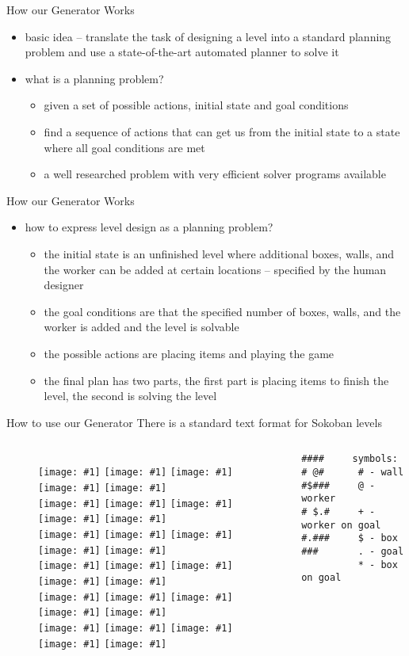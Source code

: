\documentclass[12pt, aspectratio=169]{beamer} %
\newcommand{\sokoimg}[1]{\texttt{[image: \#1]} \hspace{-0.31em}}
\newcommand{\w}{\sokoimg{../figures/wall.pdf}}
\newcommand{\e}{\sokoimg{../figures/empty.pdf}}
\newcommand{\p}{\sokoimg{../figures/player.pdf}}
\newcommand{\x}{\sokoimg{../figures/box.pdf}}
\newcommand{\g}{\sokoimg{../figures/goal.pdf}}
\newcommand{\n}{\\
\vspace{-0.1em}}
\begin{document}
\begin{frame}{How our Generator Works}
\begin{itemize}
\item basic idea -- translate the task of designing a level into a standard planning problem and use a state-of-the-art automated planner to solve it
\pause
\item what is a planning problem?
\begin{itemize}
\item given a set of possible actions, initial state and goal conditions
\item find a sequence of actions that can get us from the initial state to a state where all goal
conditions are met
\item a well researched problem with very efficient solver programs available
\end{itemize}
\end{itemize}
\end{frame}

\begin{frame}{How our Generator Works}
\begin{itemize}
\item how to express level design as a planning problem?
\pause
\begin{itemize}
\item the initial state is an unfinished level where additional boxes, walls, and the worker can
be added at certain locations -- specified by the human designer
\pause
\item the goal conditions are that the specified number of boxes, walls, and the worker is added and the level is solvable
\pause
\item the possible actions are placing items and playing the game
\pause
\item the final plan has two parts, the first part is placing items to finish the level, the second is solving the level
\end{itemize}
\end{itemize}
\end{frame}


\begin{frame}[fragile]{How to use our Generator}
There is a standard text format for Sokoban levels
\begin{columns}[c] %
\begin{figure}
\centering
\w\w\w\w\e\n
\w\e\p\w\e\n
\w\x\w\w\w\n
\w\e\x\g\w\n
\w\g\w\w\w\n
\w\w\w\e\e\n
\end{figure}

\begin{verbatim}
####     symbols:   
# @#      # - wall          
#$###     @ - worker        
# $.#     + - worker on goal
#.###     $ - box        
###       . - goal        
          * - box on goal
          
\end{verbatim}
\end{columns}
\end{frame}
\end{document}

